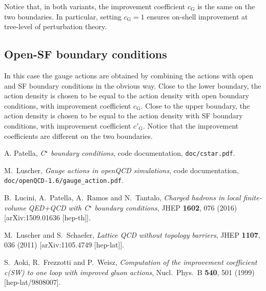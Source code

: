 \documentclass[11pt,fleqn]{article}
\begin{document}
Notice that, in both variants, the improvement coefficient $c_\text{G}$ is the same on the two boundaries. In particular, setting $c_\text{G} = 1$ ensures on-shell improvement at tree-level of perturbation theory.

\subsection{Open-SF boundary conditions}

In this case the gauge actions are obtained by combining the actions with open and SF boundary conditions in the obvious way. Close to the lower boundary, the action density is chosen to be equal to the action density with open boundary conditions, with improvement coefficient $c_\text{G}$. Close to the upper boundary, the action density is chosen to be equal to the action density with SF boundary conditions, with improvement coefficient $c'_\text{G}$. Notice that the improvement coefficients are different on the two boundaries.









\begin{thebibliography}{9}

  A. Patella,
  \textit{C$^\star$ boundary conditions}, code documentation,
  \texttt{doc/cstar.pdf}.

  M.~Luscher,
  \textit{Gauge actions in openQCD simulations}, code documentation,
  \texttt{doc/openQCD-1.6/gauge\_action.pdf}.

  B.~Lucini, A.~Patella, A.~Ramos and N.~Tantalo,
  \textit{Charged hadrons in local finite-volume QED+QCD with C$^{⋆}$ boundary conditions},
  JHEP {\bf 1602}, 076 (2016)
  [arXiv:1509.01636 [hep-th]].

  M.~Luscher and S.~Schaefer,
  \textit{Lattice QCD without topology barriers},
  JHEP {\bf 1107}, 036 (2011)
  [arXiv:1105.4749 [hep-lat]].

  S.~Aoki, R.~Frezzotti and P.~Weisz,
  \textit{Computation of the improvement coefficient c(SW) to one loop with improved gluon actions},
  Nucl.\ Phys.\ B {\bf 540}, 501 (1999)
  [hep-lat/9808007].

\end{thebibliography}
\end{document}
